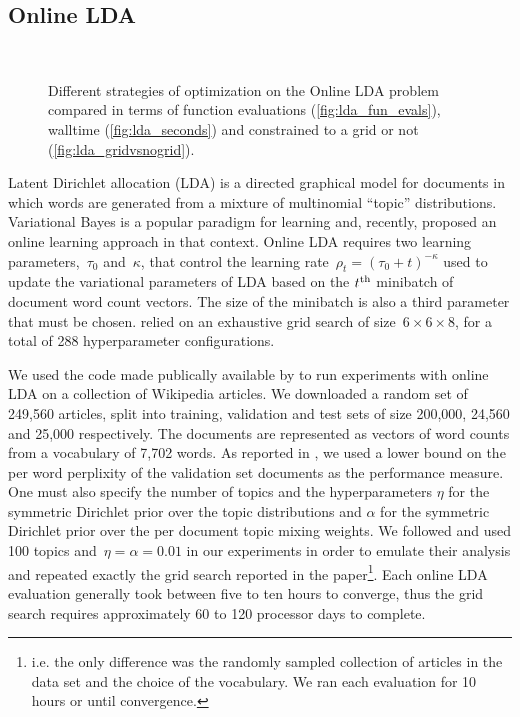 \documentclass[aos,preprint]{imsart}
\begin{document}
\subsection{Online LDA}
\begin{figure}[ht]
\begin{center}
\\
\end{center}
\caption{Different strategies of optimization on the Online LDA
  problem compared in terms of function evaluations
  (\ref{fig:lda_fun_evals}), walltime (\ref{fig:lda_seconds}) and
  constrained to a grid or not (\ref{fig:lda_gridvsnogrid}).}
\end{figure}

Latent Dirichlet allocation (LDA) is a directed graphical model for
documents in which words are generated from a mixture of multinomial
``topic'' distributions. Variational Bayes is a popular paradigm for
learning and, recently, \citet{Hoffman2010} proposed an online
learning approach in that context. Online LDA requires two learning
parameters,~$\tau_0$ and~$\kappa$, that control the learning
rate~${\rho_t = (\tau_0 + t)^{-\kappa}}$ used to update the
variational parameters of LDA based on the $t^{\rm th}$ minibatch of
document word count vectors. The size of the minibatch is also a third
parameter that must be chosen. \citet{Hoffman2010} relied on an
exhaustive grid search of size~${6\times6\times8}$, for a total of 288
hyperparameter configurations.

We used the code made publically available by \citet{Hoffman2010} to
run experiments with online LDA on a collection of Wikipedia
articles. We downloaded a random set of 249,560 articles, split into
training, validation and test sets of size 200,000, 24,560 and 25,000
respectively. The documents are represented as vectors of word counts
from a vocabulary of 7,702 words. As reported in \citet{Hoffman2010},
we used a lower bound on the per word perplixity of the validation set
documents as the performance measure. One must also specify the number
of topics and the hyperparameters $\eta$ for the symmetric Dirichlet
prior over the topic distributions and $\alpha$ for the symmetric
Dirichlet prior over the per document topic mixing weights. We
followed \citet{Hoffman2010} and used 100 topics and~${\eta = \alpha =
0.01}$ in our experiments in order to emulate their analysis and
repeated exactly the grid search reported in the
paper\footnote{i.e. the only difference was the randomly sampled
  collection of articles in the data set and the choice of the
  vocabulary. We ran each evaluation for 10 hours or until
  convergence.}. Each online LDA evaluation generally took between
five to ten hours to converge, thus the grid search requires
approximately 60 to 120 processor days to complete.
\end{document}
